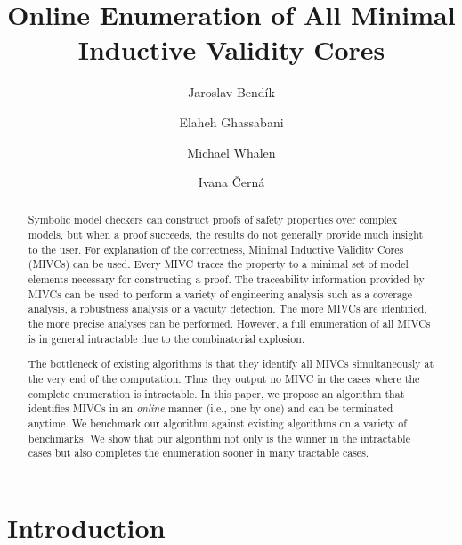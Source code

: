 \documentclass{llncs}
\begin{document}
\title{Online Enumeration of All Minimal Inductive Validity Cores}

\author{Jaroslav Bend\'ik 
	\and Elaheh Ghassabani
	\and Michael Whalen
	\and Ivana \v Cern\'a
}



\maketitle    
\begin{abstract} 
Symbolic model checkers can construct proofs of
safety properties over complex models, but when a proof succeeds,
the results do not generally provide much insight to
the user. For explanation of the correctness, Minimal Inductive Validity Cores (MIVCs) can be used. Every MIVC traces the property to a minimal set of model elements necessary
for constructing a proof. 
The traceability information provided by MIVCs can be used to perform a variety of engineering analysis such as a coverage analysis, a robustness analysis or a vacuity detection. 
The more MIVCs are identified, the more precise analyses can be performed. 
However, a full enumeration of all MIVCs
is in general intractable due to the combinatorial explosion.

The bottleneck of existing algorithms is that they identify all MIVCs simultaneously at the very end of the computation.
Thus they output no MIVC in the cases where the complete enumeration is intractable. 
In this paper, we propose an algorithm that identifies MIVCs in an \emph{online} manner (i.e., one by one)
and can be terminated anytime.
We benchmark our algorithm against existing algorithms on a variety of benchmarks. We show that our algorithm not only is the winner in the intractable cases but also completes the enumeration sooner in many tractable cases.


\end{abstract} 
 
 
 
\section{Introduction}
\label{sec:intro}

\end{document}
